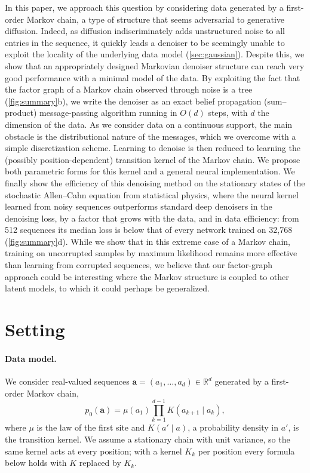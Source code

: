 \documentclass{article}
\begin{document}
In this paper, we approach this question by considering data generated by a first-order Markov chain, a type of
structure that seems adversarial to generative diffusion. Indeed, as diffusion indiscriminately adds unstructured noise
to all entries in the sequence, it quickly leads a denoiser to be seemingly unable to exploit the locality of the
underlying data model (\cref{sec:gaussian}). Despite this, we show that an appropriately designed Markovian denoiser
structure can reach very good performance with a minimal model of the data. By exploiting the fact that the factor
graph of a Markov chain observed through noise is a tree (\cref{fig:summary}b), we write the denoiser as an exact belief
propagation (sum--product) message-passing algorithm running in $O(d)$ steps, with $d$ the dimension of the data. As we
consider data on a continuous support, the main obstacle is the distributional nature of the messages, which we overcome
with a simple discretization scheme. Learning to denoise is then reduced to learning the (possibly position-dependent)
transition kernel of the Markov chain. We propose both parametric forms for this kernel and a general neural
implementation. We finally show the efficiency of this denoising method on the stationary states of the stochastic
Allen--Cahn equation from statistical physics, where the neural kernel learned from noisy sequences outperforms standard
deep denoisers in the denoising loss, by a factor that grows with the data, and in data efficiency: from 512 sequences
its median loss is below that of every network trained on 32{,}768 (\cref{fig:summary}d). While we show that in
this extreme case of a Markov chain, training on uncorrupted samples by maximum likelihood remains more effective than
learning from corrupted sequences, we believe that our factor-graph approach could be interesting where the Markov
structure is coupled to other latent models, to which it could perhaps be generalized.


\section{Setting}
\label{sec:setting}

\paragraph{Data model.}
We consider real-valued sequences $\mathbf{a}=(a_1,\ldots,a_d)\in\mathbb{R}^d$ generated by a first-order Markov chain,
\begin{equation}
p_0(\mathbf{a})=\mu(a_1)\prod_{k=1}^{d-1}K(a_{k+1}\mid a_k),
\label{eq:markov_prior}
\end{equation}
where $\mu$ is the law of the first site and $K(a'\mid a)$, a probability density in $a'$, is the transition kernel. We
assume a stationary chain with unit variance, so the same kernel acts at every position; with a kernel $K_k$ per
position every formula below holds with $K$ replaced by $K_k$.
\end{document}
